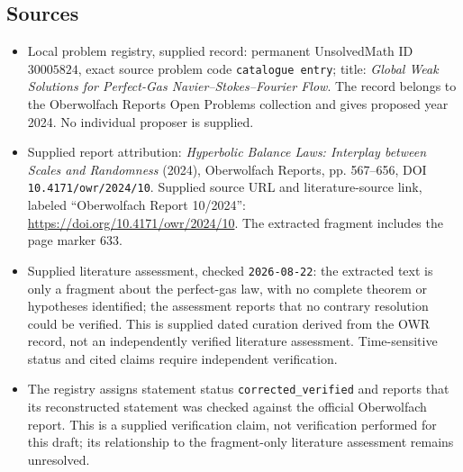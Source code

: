 \documentclass[11pt]{article}
\begin{document}
\subsection{Sources}
\begin{itemize}
\item Local problem registry, supplied record: permanent UnsolvedMath ID \(30005824\), exact source problem code \texttt{catalogue entry}; title: \emph{Global Weak Solutions for Perfect-Gas Navier--Stokes--Fourier Flow}. The record belongs to the Oberwolfach Reports Open Problems collection and gives proposed year 2024. No individual proposer is supplied.
\item Supplied report attribution: \emph{Hyperbolic Balance Laws: Interplay between Scales and Randomness} (2024), Oberwolfach Reports, pp. 567--656, DOI \texttt{10.4171/owr/2024/10}. Supplied source URL and literature-source link, labeled ``Oberwolfach Report 10/2024'': \url{https://doi.org/10.4171/owr/2024/10}. The extracted fragment includes the page marker 633.
\item Supplied literature assessment, checked \texttt{2026-08-22}: the extracted text is only a fragment about the perfect-gas law, with no complete theorem or hypotheses identified; the assessment reports that no contrary resolution could be verified. This is supplied dated curation derived from the OWR record, not an independently verified literature assessment. Time-sensitive status and cited claims require independent verification.
\item The registry assigns statement status \texttt{corrected\_verified} and reports that its reconstructed statement was checked against the official Oberwolfach report. This is a supplied verification claim, not verification performed for this draft; its relationship to the fragment-only literature assessment remains unresolved.
\end{itemize}
\end{document}
